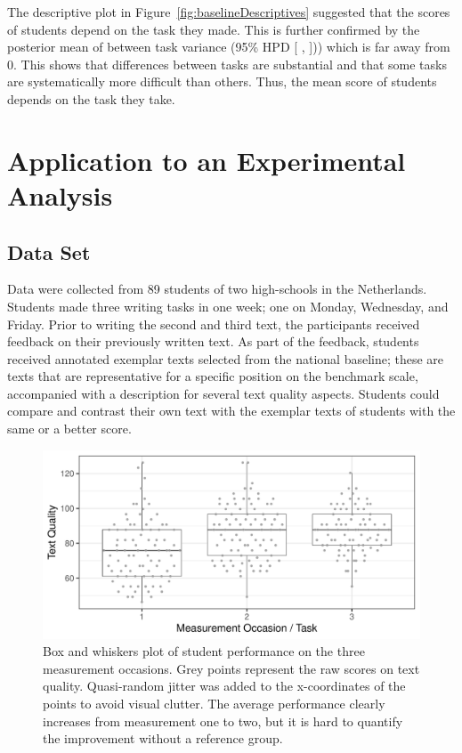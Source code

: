 \documentclass[a4paper]{article}
\newcommand{\getVal}[3]{%
	\pgfplotstablegetelem{#1}{#2}\of{#3}%
	\pgfmathprintnumber{\pgfplotsretval}%
}
\newcommand{\getCI}[2]{95\% HPD [\getVal{#1}{Lower}{#2}, \getVal{#1}{Upper}{#2}]}
\begin{document}
The descriptive plot in Figure~\ref{fig:baselineDescriptives} suggested that the scores of students depend on the task they made. This is further confirmed by the posterior mean of between task variance \getVal{5}{Mean}{\tbPostSummaryBaseline} (\getCI{5}{\tbPostSummaryBaseline})) which is far away from 0. This shows that differences between tasks are substantial and that some tasks are systematically more difficult than others. Thus, the mean score of students depends on the task they take.

\section*{Application to an Experimental Analysis}

\subsection*{Data Set}
Data were collected from 89 students of two high-schools in the Netherlands.
Students made three writing tasks in one week; one on Monday, Wednesday, and Friday.
Prior to writing the second and third text, the participants received feedback on their previously written text.
As part of the feedback, students received annotated exemplar texts selected from the national baseline; these are texts that are representative for a specific position on the benchmark scale, accompanied with a description for several text quality aspects.
Students could compare and contrast their own text with the exemplar texts of students with the same or a better score.

\begin{figure}[!ht]
	\includegraphics[width=\textwidth]{descriptivesExperimental}
	\caption{Box and whiskers plot of student performance on the three measurement occasions. Grey points represent the raw scores on text quality. Quasi-random jitter was added to the x-coordinates of the points to avoid visual clutter. The average performance clearly increases from measurement one to two, but it is hard to quantify the improvement without a reference group.}
	\label{fig:productDescriptives}
\end{figure}
\end{document}
